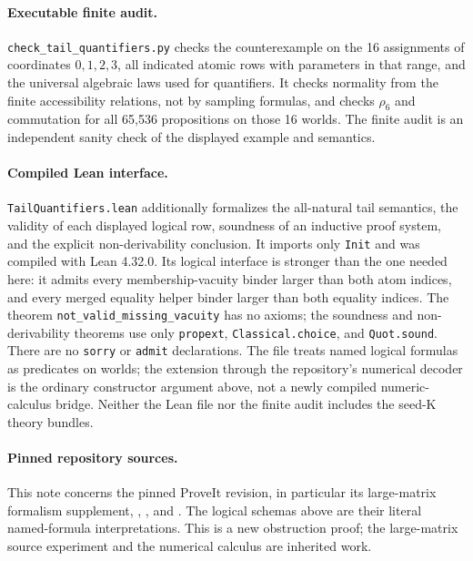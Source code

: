 \paragraph{Executable finite audit.}
\texttt{check\_tail\_quantifiers.py} checks the counterexample on the
16 assignments of coordinates $0,1,2,3$, all indicated atomic rows with
parameters in that range, and the universal algebraic laws used for
quantifiers. It checks normality from the finite accessibility relations,
not by sampling formulas, and checks $\rho_6$ and commutation for all
65,536 propositions on those 16 worlds. The finite audit is an independent
sanity check of the displayed example and semantics.

\paragraph{Compiled Lean interface.}
\texttt{TailQuantifiers.lean} additionally formalizes the all-natural
tail semantics, the validity of each displayed logical row, soundness of
an inductive proof system, and the explicit non-derivability conclusion.
It imports only \texttt{Init} and was compiled with Lean 4.32.0. Its
logical interface is stronger than the one needed here: it admits every
membership-vacuity binder larger than both atom indices, and every merged
equality helper binder larger than both equality indices. The theorem
\texttt{not\_valid\_missing\_vacuity} has no axioms; the soundness and
non-derivability theorems use only \texttt{propext},
\texttt{Classical.choice}, and \texttt{Quot.sound}. There are no
\texttt{sorry} or \texttt{admit} declarations. The file treats named
logical formulas as predicates on worlds; the extension through the
repository's numerical decoder is the ordinary constructor argument
above, not a newly compiled numeric-calculus bridge. Neither the Lean
file nor the finite audit includes the seed-K theory bundles.

\paragraph{Pinned repository sources.}
This note concerns the pinned ProveIt revision, in particular its
large-matrix formalism supplement\cite{largematrix},
,
, and
. The logical schemas above are their
literal named-formula interpretations. This is a new obstruction proof;
the large-matrix source experiment and the numerical calculus are inherited
work.

